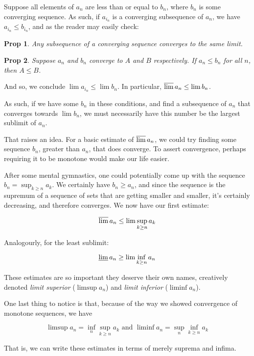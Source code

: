 \documentclass{article}
\newtheorem{prop}{Prop}
\theoremstyle{definition}
\begin{document}
	Suppose all elements of $a_n$ are less than or equal to $b_n$, where $b_n$ is some converging sequence. As such, if $a_{i_n}$ is a converging subsequence of $a_n$, we have $a_{i_n} \leq b_{i_n}$, and as the reader may easily check:
	
	\begin{prop}
	Any subsequence of a converging sequence converges to the same limit.
	\end{prop}
	
	\begin{prop}
	Suppose $a_n$ and $b_n$ converge to $A$ and $B$ respectively. If $a_n \leq b_n$ for all $n$, then $A \leq B$.
	\end{prop}
	
	And so, we conclude $\lim a_{i_n} \leq \lim b_n$. In particular, $\varlimsup a_n \leq \lim b_n$.
	
	As such, if we have some $b_n$ in these conditions, and find a subsequence of $a_n$ that converges towards $\lim b_n$, we must necessarily have this number be the largest sublimit of $a_n$.
	
	That raises an idea. For a basic estimate of $\varlimsup a_n$, we could try finding some sequence $b_n$, greater than $a_n$, that does converge. To assert convergence, perhaps requiring it to be monotone would make our life easier.
	
	After some mental gymnastics, one could potentially come up with the sequence $b_n = \sup_{k \geq n} a_k$. We certainly have $b_n \geq a_n$, and since the sequence is the supremum of a sequence of sets that are getting smaller and smaller, it's certainly decreasing, and therefore converges. We now have our first estimate:
	
	\[\varlimsup a_n \leq \lim \sup_{k \geq n} a_k\]
	
	Analogourly, for the least sublimit:
	
	\[\varliminf a_n \geq \lim \inf_{k \geq n} a_n\]
	
	These estimates are so important they deserve their own names, creatively denoted \emph{limit superior} ($\limsup a_n$) and \emph{limit inferior} ($\liminf a_n$).
	
	One last thing to notice is that, because of the way we showed convergence of monotone sequences, we have
	
	\[\limsup a_n = \inf_n \sup_{k \geq n} a_k \text{ and } \liminf a_n = \sup_n \inf_{k \geq n} a_k\]
	
	That is, we can write these estimates in terms of merely suprema and infima.
	
\end{document}
